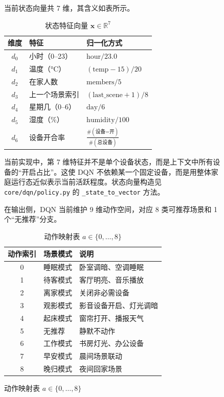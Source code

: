 \documentclass[12pt,a4paper,oneside]{ctexrep}
\begin{document}
\begin{figure}[H]
当前状态向量共 7 维，其含义如表所示。

\begin{table}[H]
    \centering
    \caption{状态特征向量 $\mathbf{x} \in \mathbb{R}^{7}$}
    \begin{tabular}{@{}cll@{}}
        \toprule
        \textbf{维度} & \textbf{特征} & \textbf{归一化方式} \\
        \midrule
        $d_0$ & 小时（0--23） & $\text{hour} / 23.0$ \\
        $d_1$ & 温度（°C） & $(\text{temp} - 15) / 20$ \\
        $d_2$ & 在家人数 & $\text{members} / 5$ \\
        $d_3$ & 上一个场景索引 & $(\text{last\_scene} + 1) / 8$ \\
        $d_4$ & 星期几（0--6） & $\text{day} / 6$ \\
        $d_5$ & 湿度（\%） & $\text{humidity} / 100$ \\
        $d_6$ & 设备开合率 & $\frac{\#(\text{设备=开})}{\#(\text{总设备})}$ \\
        \bottomrule
    \end{tabular}
\end{table}

当前实现中，第 7 维特征并不是单个设备状态，而是上下文中所有设备的“开启占比”。这使 DQN 不依赖某一个固定设备，而是用整体家庭运行态近似表示当前活跃程度。状态向量构造见 \texttt{core/dqn/policy.py} 的 \texttt{\_state\_to\_vector} 方法。

在输出侧，DQN 当前维护 9 维动作空间，对应 8 类可推荐场景和 1 个“无推荐”分支。

\begin{table}[H]
    \centering
    \caption{动作映射表 $a \in \{0,\dots,8\}$}
    \begin{tabular}{@{}cll@{}}
        \toprule
        \textbf{动作索引} & \textbf{场景模式} & \textbf{说明} \\
        \midrule
        0 & 睡眠模式 & 卧室调暗、空调睡眠 \\
        1 & 待客模式 & 客厅明亮、音乐播放 \\
        2 & 离家模式 & 关闭非必需设备 \\
        3 & 观影模式 & 影音设备开启、灯光调暗 \\
        4 & 起床模式 & 窗帘打开、播报天气 \\
        5 & 无推荐 & 静默不动作 \\
        6 & 工作模式 & 书房灯光、办公设备 \\
        7 & 早安模式 & 晨间场景联动 \\
        8 & 晚归模式 & 夜间回家场景 \\
        \bottomrule
    \end{tabular}
\end{table}


\end{figure}
\end{document}
